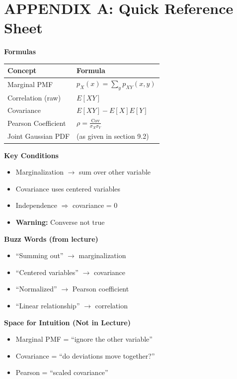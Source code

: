 \documentclass[11pt]{article}
\begin{document}
\newpage

\section*{APPENDIX A: Quick Reference Sheet}

\textbf{Formulas}
\vspace{0.3cm}

\noindent
\renewcommand{\arraystretch}{1.5}
\begin{tabular}{|l|l|}
\hline
\textbf{Concept} & \textbf{Formula} \\
\hline
Marginal PMF & $p_X(x) = \sum_y p_{XY}(x,y)$ \\
\hline
Correlation (raw) & $E[XY]$ \\
\hline
Covariance & $E[XY] - E[X]E[Y]$ \\
\hline
Pearson Coefficient & $\rho = \frac{\text{Cov}}{\sigma_X \sigma_Y}$ \\
\hline
Joint Gaussian PDF & (as given in section 9.2) \\
\hline
\end{tabular}

\vspace{0.5cm}
\textbf{Key Conditions}
\begin{itemize}
    \item Marginalization $\rightarrow$ sum over other variable
    \item Covariance uses centered variables
    \item Independence $\Rightarrow$ covariance = 0
    \item \textbf{Warning:} Converse not true
\end{itemize}

\vspace{0.3cm}
\textbf{Buzz Words (from lecture)}
\begin{itemize}
    \item ``Summing out'' $\rightarrow$ marginalization
    \item ``Centered variables'' $\rightarrow$ covariance
    \item ``Normalized'' $\rightarrow$ Pearson coefficient
    \item ``Linear relationship'' $\rightarrow$ correlation
\end{itemize}

\vspace{0.3cm}
\textbf{Space for Intuition (Not in Lecture)}
\begin{itemize}
    \item Marginal PMF = ``ignore the other variable''
    \item Covariance = ``do deviations move together?''
    \item Pearson = ``scaled covariance''
\end{itemize}
\end{document}
